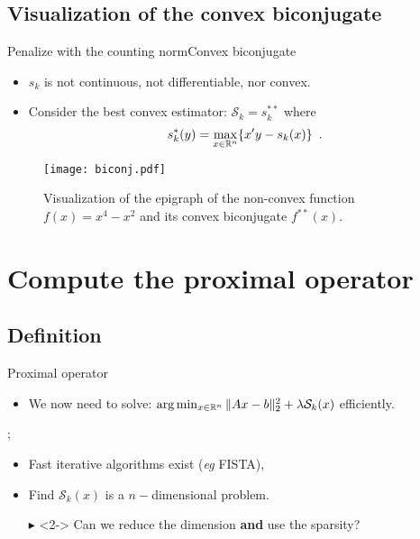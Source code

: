 \documentclass[10pt,aspectratio=43]{beamer}
\begin{document}
\subsection{Visualization of the convex biconjugate}

\begin{frame}{Penalize with the counting norm}{Convex biconjugate}
    \begin{itemize}
    \item \color{red} $s_k$ is not continuous, not differentiable, nor convex.\color{black}
    \item Consider the best convex estimator: $\mathcal{S}_k=s^{**}_k$ where
    \[s_k^*(y)=\max_{x\in\mathbb{R}^n}\{x'y - s_k(x)\}\enspace.\]
\end{itemize}

\begin{figure}
    \centering
    \texttt{[image: biconj.pdf]}
    \caption{Visualization of the epigraph of the non-convex function $f(x)=x^4-x^2$ and its convex biconjugate $f^{**}(x)$.}
    \label{fig:biconjugate_epigraph}
\end{figure}
\end{frame}

\section{Compute the proximal operator}
\subsection{Definition}
\begin{frame}{Proximal operator}{}
\begin{itemize}
    \item We now need to solve: $\arg\min_{x\in\mathbb{R}^n}\|Ax-b\|^2_2 + \lambda \mathcal{S}_k(x)$ \color{red}efficiently\color{black}.
\end{itemize}
\medskip
{}
;\medskip
\begin{itemize}
    \item Fast iterative algorithms exist (\emph{eg} FISTA),
    \item Find $\mathcal{S}_k(x)$ is a $n-$dimensional problem.
    \item[\color{red}$\blacktriangleright$\color{black}]<2-> Can we reduce the dimension \textbf{and} use the sparsity?
\end{itemize}
\end{frame}
\end{document}
